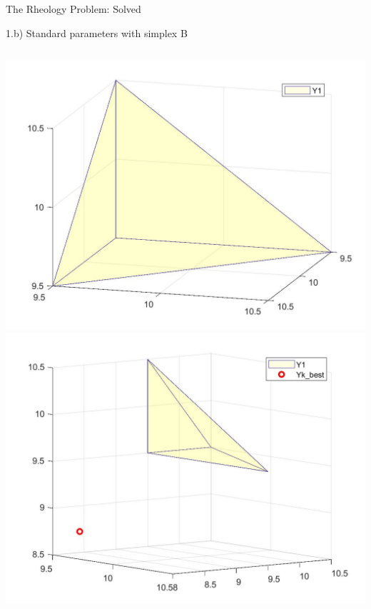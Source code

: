 \documentclass{beamer}
\begin{document}
\begin{frame}{The Rheology Problem: Solved}
\begin{block}{1.b) Standard parameters with simplex B}
\begin{columns}
\begin{column}{0.63\linewidth}
	\includegraphics[width=0.45\linewidth]{Simplex2}\\
	\vspace{5mm}
	\includegraphics[width=0.45\linewidth]{1bSimplexPlot}
\end{column}
\end{columns}
\end{block}
\end{frame}
\end{document}
